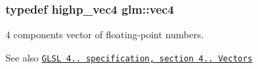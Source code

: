 \subsubsection[{\texorpdfstring{vec4}{vec4}}]{\setlength{\rightskip}{0pt plus 5cm}typedef highp\+\_\+vec4 {\bf glm\+::vec4}}\hypertarget{group__core__types_ga5881b1b022d7fd1b7218f5916532dd02}{}\label{group__core__types_ga5881b1b022d7fd1b7218f5916532dd02}
4 components vector of floating-\/point numbers.

\begin{DoxySeeAlso}{See also}
\href{http://www.opengl.org/registry/doc/GLSLangSpec.4.20.8.pdf}{\tt G\+L\+SL 4.. specification, section 4.. Vectors} 
\end{DoxySeeAlso}
